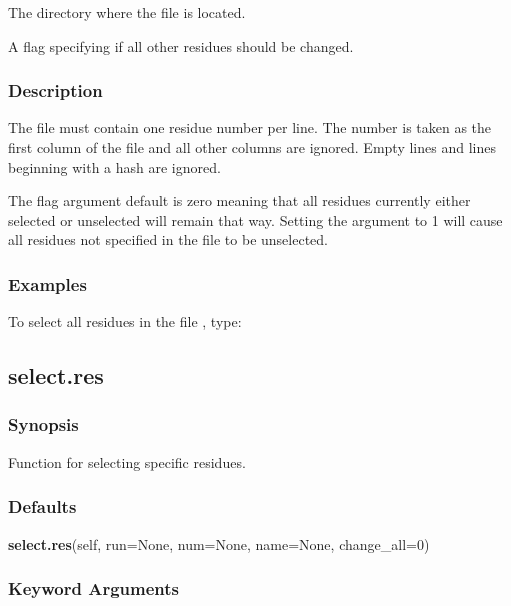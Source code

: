   The directory where the file is located.

  A flag specifying if all other residues should be changed.

\subsubsection{Description}

The file must contain one residue number per line.  The number is taken as the first column
of the file and all other columns are ignored.  Empty lines and lines beginning with a hash
are ignored.

The 
 flag argument default is zero meaning that all residues currently either
selected or unselected will remain that way.  Setting the argument to 1 will cause all
residues not specified in the file to be unselected.


\subsubsection{Examples}

To select all residues in the file 
, type:





\newpage

\subsection{select.res}


\subsubsection{Synopsis}

Function for selecting specific residues.

\subsubsection{Defaults}

\textsf{\textbf{select.res}(self, run=None, num=None, name=None, change\_all=0)}


\subsubsection{Keyword Arguments}


